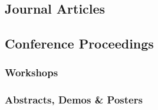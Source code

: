 {\begin{refsection}[\mypublicationsbib]
\end{refsection}

\subsection*{Journal Articles}

\begin{refsection}[\mypublicationsbib]
	\nocite{Selimi2015Cloud}
	\nocite{Khan2014Sparks}
	
	\newrefcontext[sorting=ydnt]
	\printbibliography[heading=none]
\end{refsection}

\subsection*{Conference Proceedings}

\begin{refsection}[\mypublicationsbib]
	\nocite{Khan2014Macroeconomic}
	\nocite{Khan2015DSS}
	\nocite{Khan2015Current}
	
%			

	\newrefcontext[sorting=ydnt]
	\printbibliography[heading=none]
\end{refsection}


\subsubsection*{Workshops}

\begin{refsection}[\mypublicationsbib]
	\nocite{Freitag2014Energy}
	\nocite{Khan2013Clouds}
	\nocite{Buyuksahin2013}
	
	\newrefcontext[sorting=ydnt]
	\printbibliography[heading=none]
\end{refsection}


\subsubsection*{Abstracts, Demos \& Posters}

\begin{refsection}[\mypublicationsbib]
	\nocite{Baig2015Community}
	\nocite{Selimi2014Cloud}
	\nocite{Jimenez2013}
	
	\newrefcontext[sorting=ydnt]
	\printbibliography[heading=none]
\end{refsection}


}
